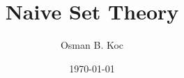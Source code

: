 \documentclass[12pt,a4paper]{article}
\title{Naive Set Theory}
\author{Osman B. Koc}
\date{\today}
\begin{document}
    \maketitle{}
    \newpage{}
    \tableofcontents{}
    \newpage{}
    
    
    
\end{document}
